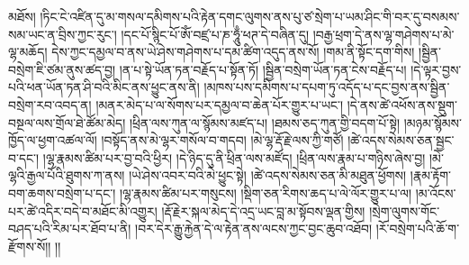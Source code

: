 མཐོས། །ཏིང་ངེ་འཛིན་དུ་མ་གསལ་དམིགས་པའི་རྟེན་དགང་ལུགས་ནས་པུ་ཙ་སྲེག་པ་ཡམ་ཤིང་གི་བར་དུ་བསམས་སམ་ཡང་ན་བྲིས་ཀྱང་རུང་། །དང་པོ་སྙིང་པོ་ཨོཾ་བཛྲ་པ་ཎ་ཧཱུྃ་ཕཊ་དེ་བཞིན་དུ། །བརྒྱ་ཕྲག་དེ་ནས་ལྷ་གཤེགས་པ་མེ་ལྷ་མཆོད། དེས་ཀྱང་དམྱལ་བ་ནས་ཡེ་ཤེས་གཤེགས་པ་དམ་ཚིག་འདུད་ནས་སོ། །གམ་ནི་སྟོང་དག་གིས། །སྦྱིན་བསྲེག་ཇི་ཙམ་ནུས་ཚད་བྱ། །ན་པ་སྟེ་ཡོན་ཏན་བརྗོད་པ་སྟོན་ཏོ། །སྦྱིན་བསྲེག་ཡོན་ཏན་ངེས་བརྗོད་པ། །དེ་ལྟར་བྱས་པའི་ཕན་ཡོན་ཏན་ཤི་བའི་མིང་ནས་ཕྱུང་ནས་ནི། །མཁས་པས་དམིགས་པ་དཔག་ཏུ་འདོད་པ་དང་བྱས་ནས་སྦྱིན་བསྲེག་རབ་འབད་ན། །མནར་མེད་པ་ལ་སོགས་པར་དམྱལ་བ་ཆེན་པོར་གྱུར་པ་ཡང་། །དེ་ནས་ཚེ་འཕོས་ནས་སྡུག་བསྔལ་ལས་གྲོལ་ཐེ་ཚོམ་མེད། །ཕྲིན་ལས་ཀུན་ལ་སྙོམས་མཛད་པ། །ཐམས་ཅད་ཀུན་གྱི་བདག་པོ་སྟེ། །མཉམ་སྙོམས་ཁྱོད་ལ་ཕྱག་འཚལ་ལོ། །བསྟོད་ནས་མེ་ལྷར་གསོལ་བ་གདབ། །མེ་ལྷ་རྡོ་རྗེ་ལས་ཀྱི་གཙོ། །ཚེ་འདས་སེམས་ཅན་སྦྱང་བ་དང་། །ལྷ་རྣམས་ཚིམ་པར་བྱ་བའི་ཕྱིར། །དེ་ཉིད་དུ་ནི་ཕྲིན་ལས་མཛོད། །ཕྲིན་ལས་རྣམ་པ་གཉིས་ཞེས་བྱ། །མེ་ལྷའི་རྒྱལ་པོའི་ཐུགས་ཀ་ནས། །ཡེ་ཤེས་འབར་བའི་མེ་ཕྱུང་སྟེ། །ཚེ་འདས་སེམས་ཅན་མི་མཐུན་ཕྱོགས། །རྣམ་རྟོག་བག་ཆགས་བསྲེག་པ་དང་། །ལྷ་རྣམས་ཚིམ་པར་གསུངས། །སྡིག་ཅན་རིགས་ཆད་པ་ལེ་ལོར་གྱུར་པ་ལ། །མ་འོངས་པར་ཚེ་འདིར་བདེ་བ་མཐོང་མི་འགྱུར། །རྡོ་རྗེར་སྐལ་མེད་དེ་འདྲ་ཡང་བླ་མ་སྟོབས་ལྡན་གྱིས། །སྲེག་ལུགས་གོང་བཤད་པའི་རིམ་པར་ཐོབ་པ་ནི། །བར་དེར་རྒྱུ་རྐྱེན་དེ་ལ་རྟེན་ནས་ལངས་ཀྱང་བྱང་ཆུབ་འཐོབ། །རོ་བསྲེག་པའི་ཆོ་ག་རྫོགས་སོ།། །།